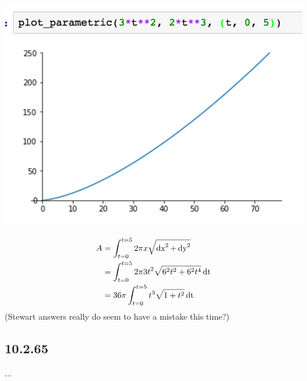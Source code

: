 \documentclass[12pt]{article}
\begin{document}
\begin{mdframed}
  \includegraphics[width=400pt]{img/10-2-66.png}

  \begin{align*}
    A &= \int_{t=0}^{t=5} 2\pi x \sqrt{\operatorname{\text{dx}}^2 + \operatorname{\text{dy}}^2}\\
      &= \int_{t=0}^{t=5} 2\pi 3t^2 \sqrt{6^2t^2 + 6^2t^4} \operatorname{\text{dt}}\\
      &= 36\pi \int_{t=0}^{t=5} t^3 \sqrt{1 + t^2} \operatorname{\text{dt}}\\
  \end{align*}
  (Stewart answers really do seem to have a mistake this time?)
\end{mdframed}

\subsection*{10.2.65}
...
\end{document}
